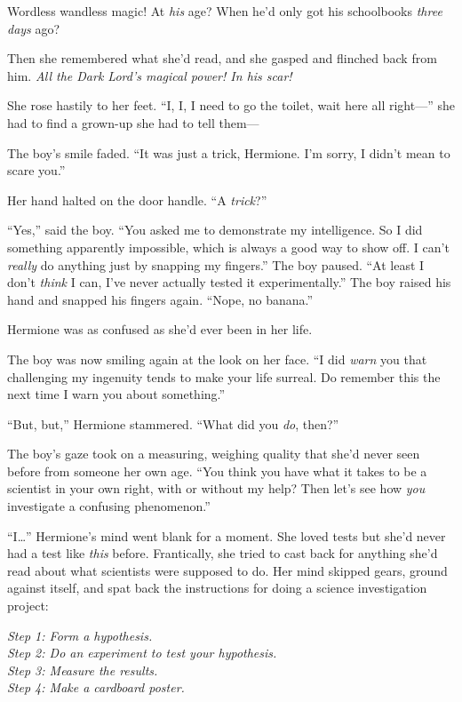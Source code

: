 Wordless wandless magic! At \emph{his} age? When he’d only got his schoolbooks \emph{three days} ago?

Then she remembered what she’d read, and she gasped and flinched back from him. \emph{All the Dark Lord’s magical power! In his scar!}

She rose hastily to her feet. “I, I, I need to go the toilet, wait here all right—” she had to find a grown-up she had to tell them—

The boy’s smile faded. “It was just a trick, Hermione. I’m sorry, I didn’t mean to scare you.”

Her hand halted on the door handle. “A \emph{trick}?”

“Yes,” said the boy. “You asked me to demonstrate my intelligence. So I did something apparently impossible, which is always a good way to show off. I can’t \emph{really} do anything just by snapping my fingers.” The boy paused. “At least I don’t \emph{think} I can, I’ve never actually tested it experimentally.” The boy raised his hand and snapped his fingers again. “Nope, no banana.”

Hermione was as confused as she’d ever been in her life.

The boy was now smiling again at the look on her face. “I did \emph{warn} you that challenging my ingenuity tends to make your life surreal. Do remember this the next time I warn you about something.”

“But, but,” Hermione stammered. “What did you \emph{do}, then?”

The boy’s gaze took on a measuring, weighing quality that she’d never seen before from someone her own age. “You think you have what it takes to be a scientist in your own right, with or without my help? Then let’s see how \emph{you} investigate a confusing phenomenon.”

“I…” Hermione’s mind went blank for a moment. She loved tests but she’d never had a test like \emph{this} before. Frantically, she tried to cast back for anything she’d read about what scientists were supposed to do. Her mind skipped gears, ground against itself, and spat back the instructions for doing a science investigation project:

\emph{Step 1: Form a hypothesis.\\
Step 2: Do an experiment to test your hypothesis.\\
Step 3: Measure the results.\\
Step 4: Make a cardboard poster.}

